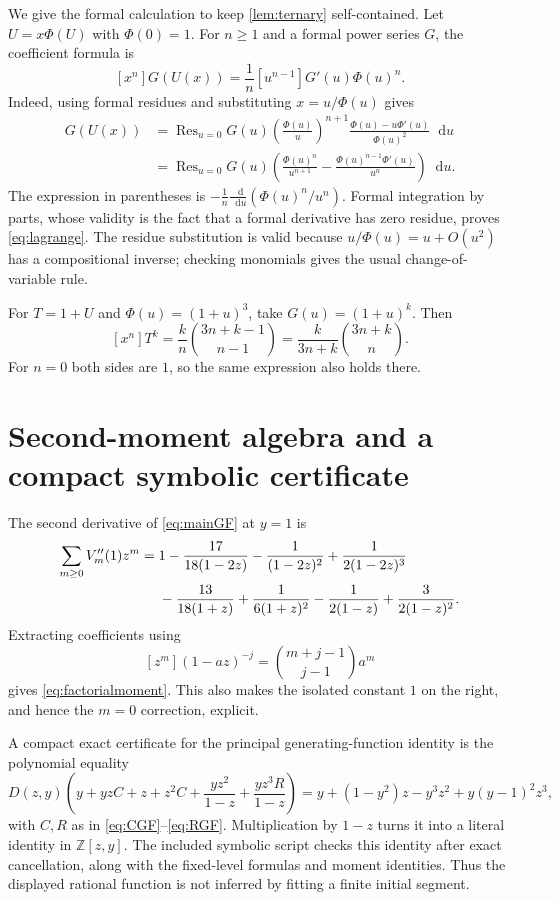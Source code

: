 \documentclass[11pt]{article}
\theoremstyle{definition}\newtheorem{definition}[theorem]{Definition}
\theoremstyle{remark}\newtheorem{remark}[theorem]{Remark}
\newcommand{\Z}{\mathbb Z}
\newcommand{\dd}{\mathop{}\!\mathrm d}
\begin{document}
We give the formal calculation to keep \cref{lem:ternary} self-contained.
Let $U=x\Phi(U)$ with $\Phi(0)=1$. For $n\geq1$ and a formal power series
$G$, the coefficient formula is
\begin{equation}\label{eq:lagrange}
 [x^n]G(U(x))=\frac1n[u^{n-1}]G'(u)\Phi(u)^n.
\end{equation}
Indeed, using formal residues and substituting $x=u/\Phi(u)$ gives
\begin{align*}
 [x^n]G(U(x))
 &=\operatorname{Res}_{u=0}
 G(u)\left(\frac{\Phi(u)}u\right)^{n+1}
 \frac{\Phi(u)-u\Phi'(u)}{\Phi(u)^2}\dd u\\
 &=\operatorname{Res}_{u=0}
 G(u)\left(\frac{\Phi(u)^n}{u^{n+1}}
 -\frac{\Phi(u)^{n-1}\Phi'(u)}{u^n}\right)\dd u.
\end{align*}
The expression in parentheses is
$-\frac1n\frac{\dd}{\dd u}(\Phi(u)^n/u^n)$. Formal integration by parts,
whose validity is the fact that a formal derivative has zero residue,
proves \eqref{eq:lagrange}. The residue substitution is valid because
$u/\Phi(u)=u+O(u^2)$ has a compositional inverse; checking monomials gives
the usual change-of-variable rule.

For $T=1+U$ and $\Phi(u)=(1+u)^3$, take $G(u)=(1+u)^k$. Then
\[
 [x^n]T^k=\frac{k}{n}\binom{3n+k-1}{n-1}
 =\frac{k}{3n+k}\binom{3n+k}{n}.
\]
For $n=0$ both sides are $1$, so the same expression also holds there.

\section{Second-moment algebra and a compact symbolic certificate}\label{sec:partials}

The second derivative of \eqref{eq:mainGF} at $y=1$ is
\begin{align}\label{eq:secondpartial}
 \sum_{m\geq0}V_m''(1)z^m
 ={}&1-\frac{17}{18(1-2z)}-\frac1{(1-2z)^2}
       +\frac1{2(1-2z)^3}\notag\\
 &-\frac{13}{18(1+z)}+\frac1{6(1+z)^2}
       -\frac1{2(1-z)}+\frac3{2(1-z)^2}.
\end{align}
Extracting coefficients using
\[
 [z^m](1-az)^{-j}=\binom{m+j-1}{j-1}a^m
\]
gives \eqref{eq:factorialmoment}. This also makes the isolated constant
$1$ on the right, and hence the $m=0$ correction, explicit.

A compact exact certificate for the principal generating-function
identity is the polynomial equality
\[
 D(z,y)\!\left(y+yzC+z+z^2C+\frac{yz^2}{1-z}
 +\frac{yz^3R}{1-z}\right)
 =y+(1-y^2)z-y^3z^2+y(y-1)^2z^3,
\]
with $C,R$ as in \eqref{eq:CGF}--\eqref{eq:RGF}. Multiplication by $1-z$
turns it into a literal identity in $\Z[z,y]$. The included symbolic
script checks this identity after exact cancellation, along with the
fixed-level formulas and moment identities. Thus the displayed rational
function is not inferred by fitting a finite initial segment.
\end{document}
